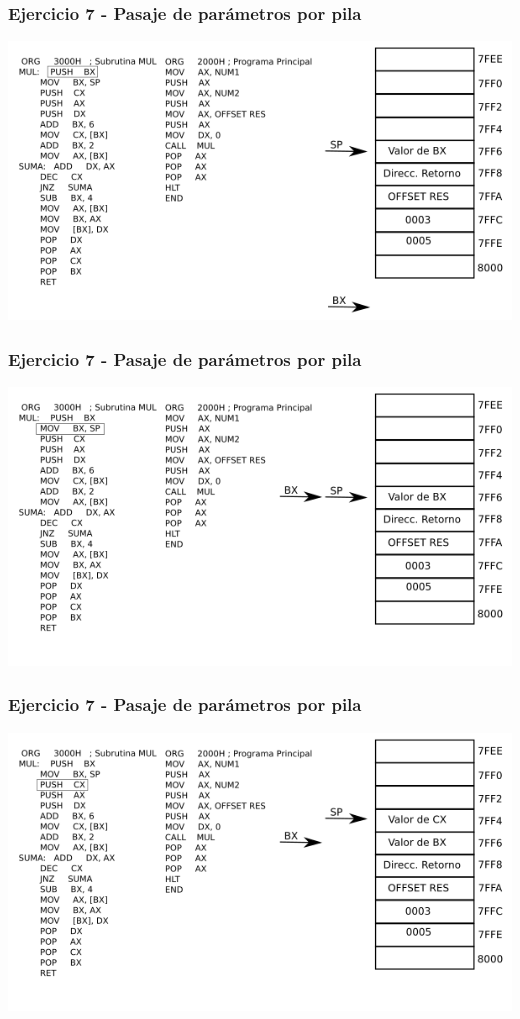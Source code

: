 \documentclass{beamer}
\begin{document}
\begin{frame}
\frametitle{Ejercicio 7 - Pasaje de parámetros por pila}
\includegraphics[scale=0.70]{imgs/imagen_006.png}
\end{frame}
\begin{frame}
\frametitle{Ejercicio 7 - Pasaje de parámetros por pila}
\includegraphics[scale=0.70]{imgs/imagen_007.png}
\end{frame}
\begin{frame}
\frametitle{Ejercicio 7 - Pasaje de parámetros por pila}
\includegraphics[scale=0.70]{imgs/imagen_008.png}
\end{frame}
\end{document}
